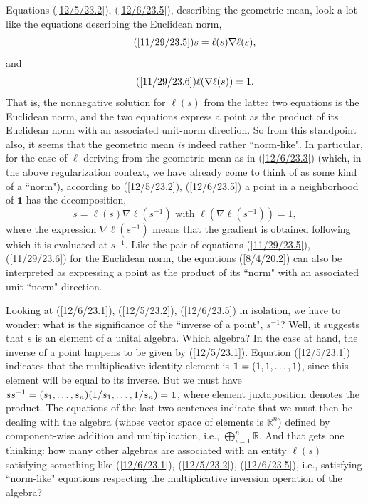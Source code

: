 \documentclass{amsart}
\numberwithin{equation}{section}
\theoremstyle{definition}
\numberwithin{theorem}{section}
\begin{document}
 
 Equations (\ref{12/5/23.2}), (\ref{12/6/23.5}), describing the geometric mean, look a lot like the equations describing the Euclidean norm,  \begin{equation}\tag{\ref{11/29/23.5}}  s = \ell(s)\nabla\ell(s),\end{equation} and \begin{equation}\tag{\ref{11/29/23.6}} \ell(\nabla\ell(s)) = 1.\end{equation}  That is, the nonnegative solution for $\ell(s)$ from the latter two equations is the Euclidean norm, and the two equations express a point as the product of its Euclidean norm with an associated unit-norm direction.
So from this standpoint also, it seems that the geometric mean {\it is} indeed rather ``norm-like".  In particular, for the case of $\ell$ deriving from the geometric mean as in (\ref{12/6/23.3}) (which, in the above regularization context, we have already come to think of as some kind of a ``norm"), according to (\ref{12/5/23.2}), (\ref{12/6/23.5}) a point in a neighborhood of $\mathbf{1}$ has the decomposition,
\begin{equation}\label{8/4/20.2} s = \ell(s)\nabla \ell(s^{-1}) \mbox{  with   }  \ell(\nabla \ell(s^{-1})) = 1,\end{equation} where the expression $\nabla \ell(s^{-1})$ means that the gradient is obtained following which it is evaluated at $s^{-1}$.  Like the pair of equations (\ref{11/29/23.5}), (\ref{11/29/23.6}) for the Euclidean norm, the equations (\ref{8/4/20.2}) can also be interpreted as expressing a point as the product of its ``norm" with an associated unit-``norm"  direction.


Looking at (\ref{12/6/23.1}), (\ref{12/5/23.2}),  (\ref{12/6/23.5}) in isolation, we have to wonder: what is the significance of the ``inverse of a point", $s^{-1}$?  Well, it suggests that $s$ is an element of a unital algebra.  Which algebra?  In the case at hand, the inverse of a point happens to be given by (\ref{12/5/23.1}).   Equation (\ref{12/5/23.1}) indicates that the multiplicative identity element is ${\bf 1}= (1,1,\dots, 1)$, since this element will be equal to its inverse.  But we must have  $ss^{-1} = (s_1,\dots,s_n)(1/s_1,\dots,1/s_n) = {\bf 1}$, where element juxtaposition denotes the product. The equations of the last two sentences indicate that we must then be dealing with the algebra (whose vector space of elements is $\mathbb{R}^n$) defined by component-wise addition and multiplication, i.e., $\bigoplus_{i=1}^n \mathbb{R}$.    And that gets one thinking: how many other algebras are associated with an entity $\ell(s)$ satisfying something like (\ref{12/6/23.1}), (\ref{12/5/23.2}),  (\ref{12/6/23.5}), i.e., satisfying ``norm-like" equations respecting the multiplicative inversion operation of the algebra?
 
\end{document}
